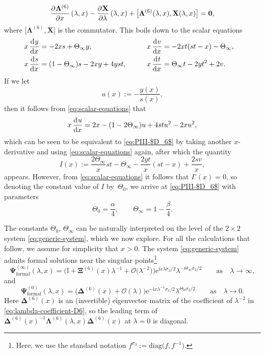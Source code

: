 \documentclass[pdftex]{sigma}
\numberwithin{equation}{section}
\newcommand{\ee}{\mathrm{e}}
\newcommand{\ii}{\mathrm{i}}
\begin{document}
\[
\dpd{\mathbf{\Lambda}^{(6)}}{x}(\lambda, x) - \dpd{\mathbf X}{\lambda}(\lambda, x) + \big[\mathbf{\Lambda}^{(6)}(\lambda, x), \mathbf X(\lambda, x)\big] = \mathbf{0},
\]
where $\big[\mathbf{\Lambda}^{(6)}, \mathbf{X}\big]$ is the commutator. This boils down to the scalar equations
\begin{alignat}{3}
& x \dod{y}{x} = -2xs + \Theta_\infty y, \qquad&&
x \dod{v}{x} = -2xt(st - x) - \Theta_\infty,&\nonumber \\
&x \dod{s}{x} = (1 - \Theta_\infty)s - 2xy + 4yst, \qquad&&
x \dod{t}{x} = \Theta_\infty t - 2yt^2 + 2v.&
\label{eq:scalar-equations}
\end{alignat}
If we let
\begin{equation}
u(x) := - \dfrac{y(x)}{s(x)},
\label{eq:u-from-y-s}
\end{equation}
then it follows from \eqref{eq:scalar-equations} that
\[
x \dod{u}{x} = 2x - (1 - 2\Theta_\infty) u + 4stu^2 - 2xu^2,
\]
which can be seen to be equivalent to \eqref{eq:PIII-$D_6$} by taking another $x$-derivative and using \eqref{eq:scalar-equations} again, after which the quantity
\[
I(x) := \dfrac{2\Theta_\infty }{x} st - \Theta_\infty - \dfrac{2yt}{x}(st - x) + \dfrac{2sv}{x},
\]
appears. However, from \eqref{eq:scalar-equations} it follows that $I'(x) = 0$, so denoting the constant value of $I$ by~$\Theta_0$, we arrive at \eqref{eq:PIII-$D_6$} with parameters
\begin{equation}
 \Theta_0=\frac{\alpha}{4}, \qquad \Theta_\infty=1-\frac{\beta}{4}.
 \label{eq:thetas-alpha-beta}
\end{equation}

The constants $\Theta_0$, $\Theta_\infty$ can be naturally interpreted on the level of the $2 \times 2$ system \eqref{eq:generic-system}, which we now explore. For all the calculations that follow, we assume for simplicity that $x > 0$. The system \eqref{eq:generic-system} admits formal solutions near the singular points\footnote{Here, we use the standard notation $f^{\sigma_3} := \mathrm{diag}\big(f, f^{-1}\big)$.}
\begin{equation}
\mathbf{\Psi}_{\text{formal}}^{(\infty)}(\lambda, x) = \big( \mathbb{I} +\mathbf{\Xi}^{(6)}(x)\lambda^{-1}+ \mathcal{O}\big(\lambda^{-2}\big) \big) \ee^{\ii x \lambda \sigma_3 /2} \lambda^{-\Theta_\infty \sigma_3/2} \qquad \text{as} \quad \lambda \to \infty,
\label{eq:formal-infty}
\end{equation}
and
\begin{equation}
\mathbf{\Psi}^{(0)}_{\text{formal}}(\lambda, x) = \big( \mathbf{\Delta}^{(6)}(x) + \mathcal{O}(\lambda) \big) \ee^{-\ii x \lambda^{-1} \sigma_3 /2} \lambda^{\Theta_0 \sigma_3/2} \qquad \text{as} \quad \lambda \to 0.
\label{eq:formal-zero}
\end{equation}
Here $\mathbf{\Delta}^{(6)}(x)$ is an (invertible) eigenvector matrix of the coefficient of $\lambda^{-2}$ in \eqref{eq:lambda-coefficient-D6}, so the leading term of $\mathbf{\Delta}^{(6)}(x)^{-1}\mathbf{\Lambda}^{(6)}(\lambda,x)\mathbf{\Delta}^{(6)}(x)$ at $\lambda=0$ is diagonal.
\end{document}
